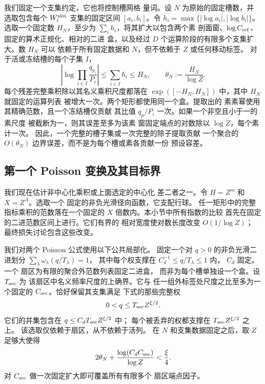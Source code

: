我们固定一个支集约定，它也将控制槽网格
量词。设 \(N\) 为原始的固定槽数，并
选取包含每个 \(W_i^{\rm slot}\) 支集的固定区间 \([a_i,b_i]\)。令
\(h_i=\max\{|\log a_i|,|\log b_i|\}\)。选取一个固定数
\(H_N\)，至少为 \(\sum_i h_i\)，将其扩大以包含两个素
剖面窗、\(\log C_{\rm ref}\)、固定的算术正规化、相对的二进
盒，以及经过 \(D\)
个运算阶段的有限多个支集扩大。数 \(H_N\) 可以
依赖于所有固定数据和 \(N\)，但不依赖于 \(Z\) 或任何移动标签。
对于活或冻结槽的每个子集 \(I\)，
\begin{equation}
 \left|\log\prod_{i\in I}\frac{q_{p_i}}{P_i}\right|
 \le\sum_{i\in I}h_i\le H_N,
 \qquad \theta_N:=\frac{H_N}{\log Z}.
 \label{eq:centered-aggregate-support}
\end{equation}
每个残差完整乘积除以其名义乘积尺度都落在
\(\exp([-H_N,H_N])\) 中，其中 \(H_N\) 就固定的运算列表
被增大一次。两个矩形都使用同一个盒。提取出的
素素幂使用其精确范数，且一个冻结槽仅贡献
其比值 \(q_p/P_i\) 一次。如果一个非空且小于一的素尺度
被截断为一，则其误差至多为该素
窗固定端点的对数除以 \(\log Z\)，每个素计一次。
因此，一个完整的槽子集或一次完整的除子提取贡献
一个聚合的 \(O(\theta_N)\) 边界误差，而不是为每个槽或素各贡献一份
预设容差。

\subsection{第一个 Poisson 变换及其目标界}\label{sec:plain-first-transform}

我们现在估计非中心化乘积或上面选定的中心化
差二者之一。令 \(H=Z^m\) 和 \(X=Z^A\)。选取一个
固定的非负光滑径向函数，它支配行球。
任一矩形中的完整指标乘积的范数落在一个固定的
\(X\) 倍数内。本小节中所有指数的比较
首先在固定的二进范数区间上进行。它们有界的
相对宽度使对数长度改变 \(O(1/\log Z)\)；
最终损失讨论包含这些改变。

我们对两个 Poisson 公式使用以下公共局部化。
固定一个对 \(q>0\) 的非负光滑二进划分
\(\sum_\lambda\omega_\lambda(q/T_\lambda)=1\)，
其中每个权支撑在 \(C_d^{-1}\le q/T_\lambda\le1\) 内，
\(C_d\) 固定。一个
扇区为有限的聚合外范数列表固定二进盒，
而非为每个槽单独设一个盒。设 \(T_{\rm sec}\) 为
该扇区中名义频率尺度的上确界。它与
任一组外标签处尺度之比至多为一个固定的
\(C_{\rm sec}\)。恰好保留其支集满足
下式的那些完整权
\[
 0<q\le T_{\rm sec}Z^{\xi/2}.
\]
它们的并集包含在 \(q\le C_dT_{\rm sec}Z^{\xi/2}\) 中；
每个被丢弃的权都支撑在 \(T_{\rm sec}Z^{\xi/2}\) 之上。
该选取仅依赖于扇区，从不依赖于活列。
在 \(N\) 和支集数据固定之后，取 \(Z\) 足够大使得
\begin{equation}
 2\theta_N+\frac{\log(C_dC_{\rm sec})}{\log Z}<\frac\xi4.
 \label{eq:centered-localization-threshold}
\end{equation}
对 \(C_{\rm sec}\) 做一次固定扩大即可覆盖所有有限多个
扇区端点因子。

